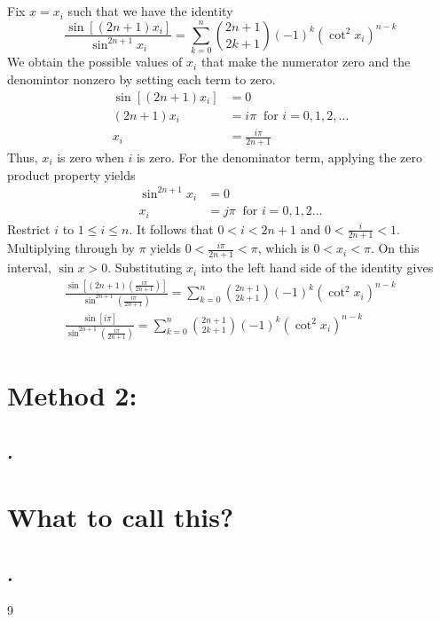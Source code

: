 \documentclass[11pt,reqno, tikz, border=3mm]{amsart}
\theoremstyle{plain}
\theoremstyle{definition}
\theoremstyle{remark}
\begin{document}
\subsection{}
Fix $x=x_i$ such that we have the identity
$$\frac{\sin\left[(2n+1)x_i\right]}{\sin^{2n+1}x_i} = \sum^n_{k=0}\binom{2n+1}{2k+1}(-1)^k(\cot^2x_i)^{n-k}$$
We obtain the possible values of $x_i$ that make the numerator zero and the denomintor nonzero by setting each term to zero.
\begin{align}
\sin[(2n+1)x_i] &= 0 \\
(2n+1)x_i &=  i\pi \ \text{ for } i = 0,1,2, \ldots \\
x_i &= \frac{i\pi}{2n+1}
\end{align}
Thus, $x_i$ is zero when $i$ is zero. For the denominator term, applying the zero product property yields
\begin{align}
\sin^{2n+1}x_i &= 0 \\
x_i &= j\pi \ \text{ for } i = 0,1,2 \ldots 
\end{align}
Restrict $i$ to $1 \le i \le n$. It follows that $0 < i < 2n+1$ and $0 < \frac{i}{2n+1} < 1$. Multiplying through by $\pi$ yields $0 < \frac{i\pi}{2n+1} < \pi$, which is $0 < x_i < \pi$. On this interval, $\sin x > 0$. Substituting $x_i$ into the left hand side of the identity gives
\begin{align}
\frac{\sin\left[(2n+1)\left(\frac{i\pi}{2n+1}\right)\right]}{\sin^{2n+1}\left(\frac{i\pi}{2n+1}\right)} = \sum^n_{k=0}\binom{2n+1}{2k+1}(-1)^k(\cot^2x_i)^{n-k} \\
\frac{\sin\left[i\pi\right]}{\sin^{2n+1}\left(\frac{i\pi}{2n+1}\right)} = \sum^n_{k=0}\binom{2n+1}{2k+1}(-1)^k(\cot^2x_i)^{n-k}
\end{align}
\section{Method 2: }
% 
\subsection{.}

\section{What to call this?}
% 

\subsection{.}

\begin{thebibliography}{9}

\end{thebibliography}
\end{document}
